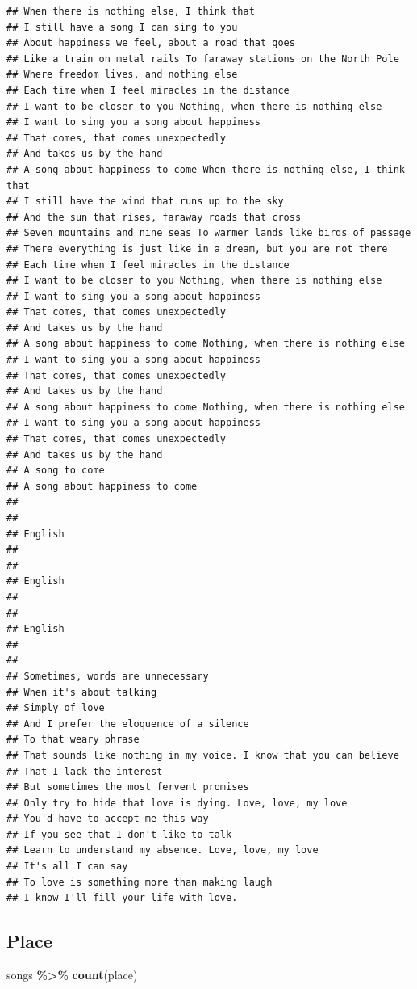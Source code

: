 \documentclass[
]{article}
\newenvironment{Shaded}{\begin{snugshade}}{\end{snugshade}}
\newcommand{\FunctionTok}[1]{\textcolor[rgb]{0.13,0.29,0.53}{\textbf{#1}}}
\newcommand{\NormalTok}[1]{#1}
\newcommand{\SpecialCharTok}[1]{\textcolor[rgb]{0.81,0.36,0.00}{\textbf{#1}}}
\begin{document}
\begin{verbatim}
## When there is nothing else, I think that
## I still have a song I can sing to you
## About happiness we feel, about a road that goes
## Like a train on metal rails To faraway stations on the North Pole
## Where freedom lives, and nothing else
## Each time when I feel miracles in the distance
## I want to be closer to you Nothing, when there is nothing else
## I want to sing you a song about happiness
## That comes, that comes unexpectedly
## And takes us by the hand
## A song about happiness to come When there is nothing else, I think that
## I still have the wind that runs up to the sky
## And the sun that rises, faraway roads that cross
## Seven mountains and nine seas To warmer lands like birds of passage
## There everything is just like in a dream, but you are not there
## Each time when I feel miracles in the distance
## I want to be closer to you Nothing, when there is nothing else
## I want to sing you a song about happiness
## That comes, that comes unexpectedly
## And takes us by the hand
## A song about happiness to come Nothing, when there is nothing else
## I want to sing you a song about happiness
## That comes, that comes unexpectedly
## And takes us by the hand
## A song about happiness to come Nothing, when there is nothing else
## I want to sing you a song about happiness
## That comes, that comes unexpectedly
## And takes us by the hand
## A song to come
## A song about happiness to come
## 
## 
## English
## 
## 
## English
## 
## 
## English
## 
## 
## Sometimes, words are unnecessary
## When it's about talking
## Simply of love
## And I prefer the eloquence of a silence
## To that weary phrase
## That sounds like nothing in my voice. I know that you can believe
## That I lack the interest
## But sometimes the most fervent promises
## Only try to hide that love is dying. Love, love, my love
## You'd have to accept me this way
## If you see that I don't like to talk
## Learn to understand my absence. Love, love, my love
## It's all I can say
## To love is something more than making laugh
## I know I'll fill your life with love.
\end{verbatim}

\subsection{Place}\label{place}

\begin{Shaded}
\begin{Highlighting}[]
\NormalTok{songs }\SpecialCharTok{\%\textgreater{}\%} \FunctionTok{count}\NormalTok{(place)}
\end{Highlighting}
\end{Shaded}
\end{document}
